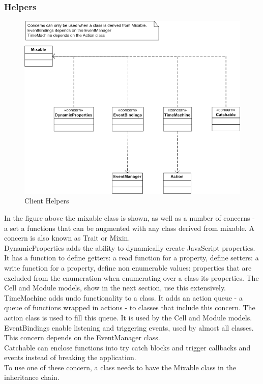 \documentclass{report}
\begin{document}
				\subsubsection{Helpers}
					\begin{figure}[htb]
						\begin{center}
							\includegraphics[width=\linewidth]{helpers.png}
							\caption{Client Helpers}
							\label{fig: cmodels}
						\end{center}
					\end{figure}	
					In the figure above the mixable class is shown, as well as a number of concerns - a set a functions that can be augmented with any class derived from mixable. A concern is also known as Trait or Mixin.\\
					DynamicProperties adds the ability to dynamically create JavaScript properties. It has a function to define getters: a read function for a property, define setters: a write function for a property, define non enumerable values: properties that are excluded from the enumeration when enumerating over a class its properties. The Cell and Module models, show in the next section, use this extensively.\\
					TimeMachine adds undo functionality to a class. It adds an action queue - a queue of functions wrapped in actions - to classes that include this concern. The action class is used to fill this queue. It is used by the Cell and Module models.\\
					EventBindings enable listening and triggering events, used by almost all classes. This concern depends on the EventManager class.\\
					Catchable can enclose functions into try catch blocks and trigger callbacks and events instead of breaking the application.\\
					To use one of these concern, a class needs to have the Mixable class in the inheritance chain.
				
\end{document}
